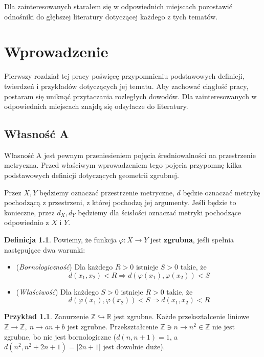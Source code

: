 \documentclass[licencjacka]{pracamgr}
\theoremstyle{definition}
\newtheorem{definition}{Definicja}[section]
\theoremstyle{definition}
\theoremstyle{definition}
\theoremstyle{definition}
\newtheorem{example}{Przykład}[section]
\theoremstyle{definition}
\theoremstyle{plain}
\theoremstyle{plain}
\begin{document}
Dla zainteresowanych starałem się w odpowiednich miejscach pozostawić odnośniki 
do głębszej literatury dotyczącej każdego z tych tematów.


\chapter{Wprowadzenie}

Pierwszy rozdział tej pracy poświęcę przypomnieniu podstawowych definicji, 
twierdzeń i przykładów dotyczących jej tematu. Aby zachować ciągłość pracy, 
postaram się uniknąć przytaczania rozległych dowodów. Dla zainteresowanych 
w odpowiednich miejscach znajdą się odsyłacze do literatury.

\section{Własność A}

Własność A jest pewnym przeniesieniem pojęcia średniowalności na przestrzenie metryczna. 
Przed właściwym wprowadzeniem tego pojęcia przypomnę kilka podstawowych 
definicji dotyczących geometrii zgrubnej.

Przez $ X,Y $ będziemy oznaczać przestrzenie metryczne, $ d $ będzie oznaczać metrykę 
pochodzącą z przestrzeni, z której pochodzą jej argumenty. Jeśli będzie to konieczne, 
przez $ d_X, d_Y $ będziemy dla ścisłości oznaczać metryki pochodzące odpowiednio z $ X $ 
i $ Y $.

\begin{definition}
	Powiemy, że funkcja $ \varphi: X \rightarrow Y $ jest \textbf{zgrubna}, jeśli 
	spełnia następujące dwa warunki:
	\begin{itemize}
	\item (\textit{Bornologiczność}) Dla każdego $ R > 0 $ istnieje $ S > 0 $ 
	takie, że 
	$$ d(x_1,x_2) < R \Rightarrow d \left( \varphi(x_1), \varphi(x_2)\right) < S $$
	\item (\textit{Właściwość}) Dla każdego $ S > 0 $ istnieje $ R > 0 $ takie, że 
	$$ d\left(\varphi(x_1), \varphi(x_2)\right) < S \Rightarrow d(x_1,x_2) < R $$
	\end{itemize}
\end{definition}

\begin{example}
	Zanurzenie $ \mathbb{Z} \hookrightarrow \mathbb{R} $ jest zgrubne. Każde 
	przekształcenie liniowe $ \mathbb{Z} \rightarrow \mathbb{Z}, ~ n \rightarrow
	an + b$ jest zgrubne. Przekształcenie $ \mathbb{Z} \ni n \rightarrow n^2 \in 
	\mathbb{Z} $ nie jest zgrubne, bo nie jest bornologiczne ($ d(n, n+1) = 1 $, a 
	$ d(n^2, n^2 + 2n + 1) = |2n+1| $ jest dowolnie duże).
\end{example}
\end{document}
